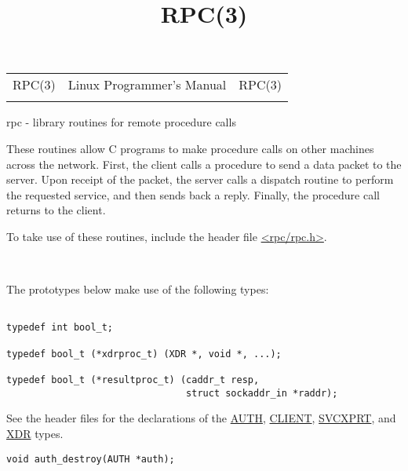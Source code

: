 \documentclass[]{article}
\title{RPC(3)}
\author{}
\date{}
\renewcommand{\emph}[1]{\underline{#1}}
\begin{document}
\maketitle

\begin{longtable}[c]{@{}lll@{}}
\toprule\addlinespace
RPC(3) & Linux Programmer's Manual & RPC(3)
\\\addlinespace
\bottomrule
\end{longtable}


rpc - library routines for remote procedure calls


These routines allow C programs to make procedure calls on other
machines across the network. First, the client calls a procedure to send
a data packet to the server. Upon receipt of the packet, the server
calls a dispatch routine to perform the requested service, and then
sends back a reply. Finally, the procedure call returns to the client.

To take use of these routines, include the header file
\emph{\textless{}rpc/rpc.h\textgreater{}}.

~

The prototypes below make use of the following types: \\

\begin{verbatim}

typedef int bool_t;

typedef bool_t (*xdrproc_t) (XDR *, void *, ...);

typedef bool_t (*resultproc_t) (caddr_t resp,
                                struct sockaddr_in *raddr);
\end{verbatim}

See the header files for the declarations of the \emph{AUTH},
\emph{CLIENT}, \emph{SVCXPRT}, and \emph{XDR} types.

\begin{verbatim}
void auth_destroy(AUTH *auth);
\end{verbatim}
\end{document}
